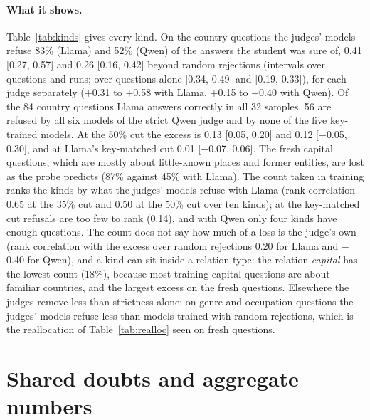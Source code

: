 \paragraph{What it shows.} Table~\ref{tab:kinds} gives every kind. On the country questions the judges' models refuse 83\% (Llama) and 52\% (Qwen) of the answers the student was sure of, 0.41 [0.27, 0.57] and 0.26 [0.16, 0.42] beyond random rejections (intervals over questions and runs; over questions alone [0.34, 0.49] and [0.19, 0.33]), for each judge separately ($+$0.31 to $+$0.58 with Llama, $+$0.15 to $+$0.40 with Qwen). Of the 84 country questions Llama answers correctly in all 32 samples, 56 are refused by all six models of the strict Qwen judge and by none of the five key-trained models. At the 50\% cut the excess is 0.13 [0.05, 0.20] and 0.12 [$-$0.05, 0.30], and at Llama's key-matched cut 0.01 [$-$0.07, 0.06]. The fresh capital questions, which are mostly about little-known places and former entities, are lost as the probe predicts (87\% against 45\% with Llama). The count taken in training ranks the kinds by what the judges' models refuse with Llama (rank correlation 0.65 at the 35\% cut and 0.50 at the 50\% cut over ten kinds); at the key-matched cut refusals are too few to rank (0.14), and with Qwen only four kinds have enough questions. The count does not say how much of a loss is the judge's own (rank correlation with the excess over random rejections 0.20 for Llama and $-$0.40 for Qwen), and a kind can sit inside a relation type: the relation \emph{capital} has the lowest count (18\%), because most training capital questions are about familiar countries, and the largest excess on the fresh questions. Elsewhere the judges remove less than strictness alone: on genre and occupation questions the judges' models refuse less than models trained with random rejections, which is the reallocation of Table~\ref{tab:realloc} seen on fresh questions.

\section{Shared doubts and aggregate numbers}
\label{app:shared}


